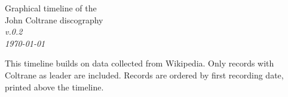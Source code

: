 \documentclass[landscape]{article}
\begin{document}
\thispagestyle{empty}

\begin{minipage}[t]{.4\textwidth}
{\LARGE Graphical timeline of the\\John Coltrane discography}\\[\medskipamount]
\textit{v.0.2\\\today}
\end{minipage}
\hfill
\begin{minipage}[t]{.38\textwidth}
This timeline builds on data collected from Wikipedia. Only records with Coltrane as leader are included. Records are ordered by first recording date, printed above the timeline.
\end{minipage}


\vfill

\center
\end{document}
